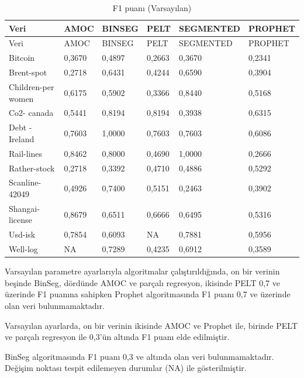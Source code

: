 \documentclass[12pt,twoside]{deuthesis}
\begin{document}
\begin{longtable}[]{@{}llllll@{}}
\caption{\label{tab:nvar2} F1 puanı (Varsayılan)}\tabularnewline
\toprule\noalign{}
Veri & AMOC & BINSEG & PELT & SEGMENTED & PROPHET \\
\midrule\noalign{}
\endfirsthead
\toprule\noalign{}
Veri & AMOC & BINSEG & PELT & SEGMENTED & PROPHET \\
\midrule\noalign{}
\endhead
\bottomrule\noalign{}
\endlastfoot
Bitcoin & 0,3670 & 0,4897 & 0,2663 & 0,3670 & 0,2341 \\
Brent-spot & 0,2718 & 0,6431 & 0,4244 & 0,6590 & 0,3904 \\
Children-per women & 0,6175 & 0,5902 & 0,3366 & 0,8440 & 0,5168 \\
Co2- canada & 0,5441 & 0,8194 & 0,8194 & 0,3938 & 0,6315 \\
Debt -Ireland & 0,7603 & 1,0000 & 0,7603 & 0,7603 & 0,6086 \\
Rail-lines & 0,8462 & 0,8000 & 0,4690 & 1,0000 & 0,2666 \\
Rather-stock & 0,2718 & 0,3392 & 0,4710 & 0,4886 & 0,5292 \\
Scanline-42049 & 0,4926 & 0,7400 & 0,5151 & 0,2463 & 0,3902 \\
Shangai-license & 0,8679 & 0,6511 & 0,6666 & 0,6495 & 0,5316 \\
Usd-isk & 0,7854 & 0,6093 & NA & 0,7881 & 0,5956 \\
Well-log & NA & 0,7289 & 0,4235 & 0,6912 & 0,3589 \\
\end{longtable}

Varsayılan parametre ayarlarıyla algoritmalar çalıştırıldığında, on bir verinin beşinde BinSeg, dördünde AMOC ve parçalı regresyon, ikisinde PELT 0,7 ve üzerinde F1 puanına sahipken Prophet algoritmasında F1 puanı 0,7 ve üzerinde olan veri bulunmamaktadır.

Varsayılan ayarlarda, on bir verinin ikisinde AMOC ve Prophet ile, birinde PELT ve parçalı regresyon ile 0,3'ün altında F1 puanı elde edilmiştir.

BinSeg algoritmasında F1 puanı 0,3 ve altında olan veri bulunmamaktadır.
Değişim noktası tespit edilemeyen durumlar (NA) ile gösterilmiştir.
\end{document}
